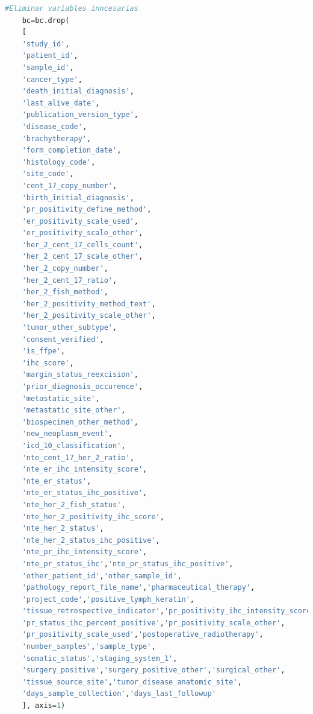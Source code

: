 \begin{lstlisting}[basicstyle=\tiny,language=Python, label=eliminacion, caption=Eliminar datos poco relvantes en Python.]
	#Eliminar variables inncesarias
	bc=bc.drop(
	[
	'study_id',
	'patient_id',
	'sample_id',
	'cancer_type',
	'death_initial_diagnosis',
	'last_alive_date',
	'publication_version_type',
	'disease_code',
	'brachytherapy',
	'form_completion_date',
	'histology_code',
	'site_code',
	'cent_17_copy_number',
	'birth_initial_diagnosis',
	'pr_positivity_define_method',
	'er_positivity_scale_used',
	'er_positivity_scale_other',
	'her_2_cent_17_cells_count',
	'her_2_cent_17_scale_other',
	'her_2_copy_number',
	'her_2_cent_17_ratio',
	'her_2_fish_method',
	'her_2_positivity_method_text',
	'her_2_positivity_scale_other',
	'tumor_other_subtype',
	'consent_verified',
	'is_ffpe',
	'ihc_score',
	'margin_status_reexcision',
	'prior_diagnosis_occurence',
	'metastatic_site',
	'metastatic_site_other',
	'biospecimen_other_method',
	'new_neoplasm_event',
	'icd_10_classification',
	'nte_cent_17_her_2_ratio',
	'nte_er_ihc_intensity_score',
	'nte_er_status',
	'nte_er_status_ihc_positive',
	'nte_her_2_fish_status',
	'nte_her_2_positivity_ihc_score',
	'nte_her_2_status',
	'nte_her_2_status_ihc_positive',
	'nte_pr_ihc_intensity_score',
	'nte_pr_status_ihc','nte_pr_status_ihc_positive',
	'other_patient_id','other_sample_id',
	'pathology_report_file_name','pharmaceutical_therapy',
	'project_code','positive_lymph_keratin',
	'tissue_retrospective_indicator','pr_positivity_ihc_intensity_score',
	'pr_status_ihc_percent_positive','pr_positivity_scale_other',
	'pr_positivity_scale_used','postoperative_radiotherapy',
	'number_samples','sample_type',
	'somatic_status','staging_system_1',
	'surgery_positive','surgery_positive_other','surgical_other',
	'tissue_source_site','tumor_disease_anatomic_site',
	'days_sample_collection','days_last_followup'
	], axis=1)
\end{lstlisting}

